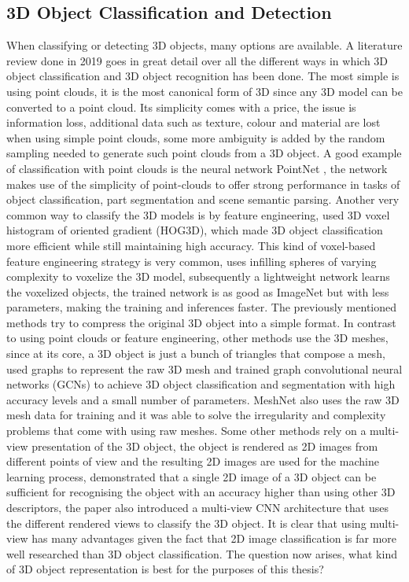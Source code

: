 \documentclass[a4paper,11pt,oneside]{article}
\begin{document}
  \subsection{3D Object Classification and Detection} \label{3Dclassification}
  When classifying or detecting 3D objects, many options are available. A literature review \cite{3dlitreview} done in 2019 goes in great detail over all the different ways in which 3D object classification and 3D object recognition has been done.
  The most simple is using point clouds, it is the most canonical form of 3D since any 3D model can be converted to a point cloud. Its simplicity comes with a price, the issue is information loss, additional data such as texture, colour and material are lost when using simple point clouds, some more ambiguity is added by the random sampling needed to generate such point clouds from a 3D object. A good example of classification with point clouds is the neural network PointNet \cite{qi2016pointnet}, the network makes use of the simplicity of point-clouds to offer strong performance in tasks of object classification, part segmentation and scene semantic parsing. Another very common way to classify the 3D models is by feature engineering, \cite{10.1007/978-981-16-5348-3_36} used 3D voxel histogram of oriented gradient (HOG3D), which made 3D object classification more efficient while still maintaining high accuracy. This kind of voxel-based feature engineering strategy is very common, \cite{https://doi.org/10.48550/arxiv.1912.11606} uses infilling spheres of varying complexity to voxelize the 3D model, subsequently a lightweight network learns the voxelized objects, the trained network is as good as ImageNet but with less parameters, making the training and inferences faster. The previously mentioned methods try to compress the original 3D object into a simple format. In contrast to using point clouds or feature engineering, other methods use the 3D meshes, since at its core, a 3D object is just a bunch of triangles that compose a mesh, \cite{https://doi.org/10.48550/arxiv.2106.15778} used graphs to represent the raw 3D mesh and trained graph convolutional neural networks (GCNs) to achieve 3D object classification and segmentation with high accuracy levels and a small number of parameters. MeshNet \cite{feng2019meshnet} also uses the raw 3D mesh data for training and it was able to solve the irregularity and complexity problems that come with using raw meshes. Some other methods rely on a multi-view presentation of the 3D object, the object is rendered as 2D images from different points of view and the resulting 2D images are used for the machine learning process, \cite{https://doi.org/10.48550/arxiv.1505.00880} demonstrated that a single 2D image of a 3D object can be sufficient for recognising the object with an accuracy higher than using other 3D descriptors, the paper also introduced a multi-view CNN architecture that uses the different rendered views to classify the 3D object. It is clear that using multi-view has many advantages given the fact that 2D image classification is far more well researched than 3D object classification. The question now arises, what kind of 3D object representation is best for the purposes of this thesis? \\
\end{document}
